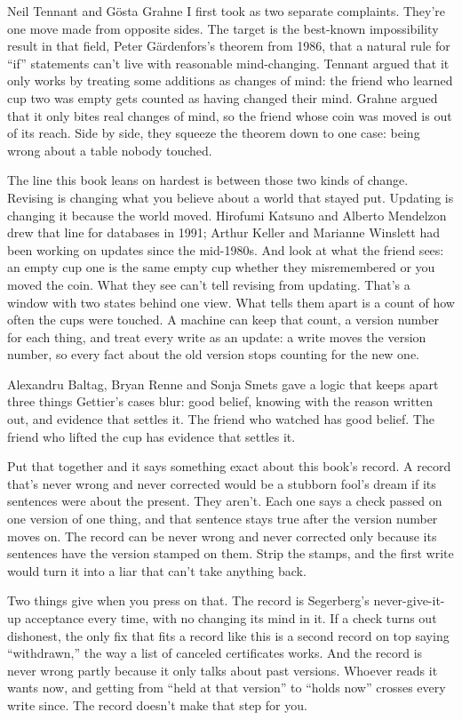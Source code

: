 \documentclass[11pt,twoside]{article}
\theoremstyle{thielethm}
\theoremstyle{thieledef}
\theoremstyle{thieledef}
\theoremstyle{thieledef}
\theoremstyle{thielethm}
\theoremstyle{thieleobs}
\theoremstyle{thielethm}
\begin{document}
Neil Tennant and Gösta Grahne I first took as two separate complaints. They're one move made from opposite sides. The target is the best-known impossibility result in that field, Peter Gärdenfors's theorem from 1986, that a natural rule for ``if'' statements can't live with reasonable mind-changing. Tennant argued that it only works by treating some additions as changes of mind: the friend who learned cup two was empty gets counted as having changed their mind. Grahne argued that it only bites real changes of mind, so the friend whose coin was moved is out of its reach. Side by side, they squeeze the theorem down to one case: being wrong about a table nobody touched.

The line this book leans on hardest is between those two kinds of change. Revising is changing what you believe about a world that stayed put. Updating is changing it because the world moved. Hirofumi Katsuno and Alberto Mendelzon drew that line for databases in 1991; Arthur Keller and Marianne Winslett had been working on updates since the mid-1980s. And look at what the friend sees: an empty cup one is the same empty cup whether they misremembered or you moved the coin. What they see can't tell revising from updating. That's a window with two states behind one view. What tells them apart is a count of how often the cups were touched. A machine can keep that count, a version number for each thing, and treat every write as an update: a write moves the version number, so every fact about the old version stops counting for the new one.

Alexandru Baltag, Bryan Renne and Sonja Smets gave a logic that keeps apart three things Gettier's cases blur: good belief, knowing with the reason written out, and evidence that settles it. The friend who watched has good belief. The friend who lifted the cup has evidence that settles it.

Put that together and it says something exact about this book's record. A record that's never wrong and never corrected would be a stubborn fool's dream if its sentences were about the present. They aren't. Each one says a check passed on one version of one thing, and that sentence stays true after the version number moves on. The record can be never wrong and never corrected only because its sentences have the version stamped on them. Strip the stamps, and the first write would turn it into a liar that can't take anything back.

Two things give when you press on that. The record is Segerberg's never-give-it-up acceptance every time, with no changing its mind in it. If a check turns out dishonest, the only fix that fits a record like this is a second record on top saying ``withdrawn,'' the way a list of canceled certificates works. And the record is never wrong partly because it only talks about past versions. Whoever reads it wants now, and getting from ``held at that version'' to ``holds now'' crosses every write since. The record doesn't make that step for you.
\end{document}
